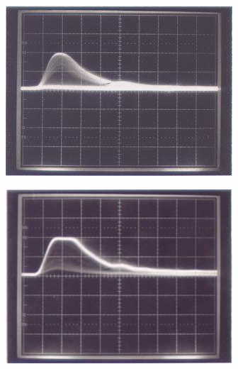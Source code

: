 \documentclass{../lab}
\begin{document}
\begin{enumerate}
\begin{figure}[!h]
  \href{http://experimentationlab.berkeley.edu/sites/default/files/images/BRAimage015.jpg}{\includegraphics[width=\linewidth,keepaspectratio]{images/BRAimage015.jpg}}
  \caption{}
  \label{fig:Signal1}
\endminipage\hfill
{}
 \href{http://experimentationlab.berkeley.edu/sites/default/files/images/320px-BRAimage016.jpg}{\includegraphics[width=\linewidth,keepaspectratio]{images/320px-BRAimage016.jpg}}
  \caption{}
  \label{fig:Signal2}
\endminipage\hfill
{}

\end{figure}
\end{enumerate}
\end{document}
